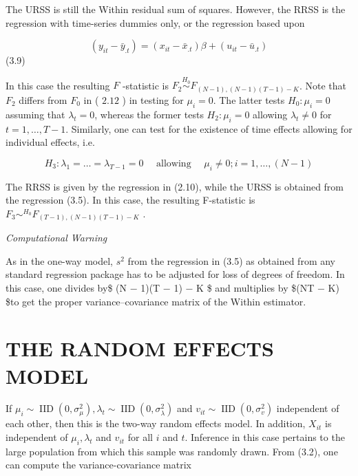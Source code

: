 \documentclass[
]{book}
\begin{document}
The URSS is still the Within residual sum of squares. However, the RRSS is the regression with time-series dummies only, or the regression based upon

\begin{equation}
\left(y_{i t}-\bar{y}_{. t}\right)=\left(x_{i t}-\bar{x}_{. t}\right) \beta+\left(u_{i t}-\bar{u}_{. t}\right)
\end{equation} (3.9)

In this case the resulting \(F\) -statistic is \(F_{2} \stackrel{H_{0}}{\sim} F_{(N-1),(N-1)(T-1)-K}\). Note that \(F_{2}\) differs from \(F_{0}\) in ( \(2.12\) ) in testing for \(\mu_{i}=0\). The latter tests \(H_{0}: \mu_{i}=0\) assuming that \(\lambda_{t}=0\), whereas the former tests \(H_{2}: \mu_{i}=0\) allowing \(\lambda_{t} \neq 0\) for \(t=1, \ldots, T-1\). Similarly, one can test for the existence of time effects allowing for individual effects, i.e.

\begin{equation}
H_{3}: \lambda_{1}=\ldots=\lambda_{T-1}=0 \quad \text { allowing } \quad \mu_{i} \neq 0 ; i=1, \ldots,(N-1)
\end{equation}

The RRSS is given by the regression in (2.10), while the URSS is obtained from the regression
(3.5). In this case, the resulting F-statistic is \(F_{3} \sim^{H_{0}} F_{(T-1),(N-1)(T-1)-K}\) .

\emph{Computational Warning}

As in the one-way model, \(s^2\) from the regression in (3.5) as obtained from any standard regression package has to be adjusted for loss of degrees of freedom. In this case, one divides by\$ (N − 1)(T − 1) − K \$ and multiplies by \$(NT − K) \$to get the proper variance--covariance matrix of the Within estimator.

\hypertarget{the-random-effects-model-1}{%
\section{THE RANDOM EFFECTS MODEL}\label{the-random-effects-model-1}}

If \(\mu_{i} \sim \operatorname{IID}\left(0, \sigma_{\mu}^{2}\right), \lambda_{t} \sim \operatorname{IID}\left(0, \sigma_{\lambda}^{2}\right)\) and \(v_{i t} \sim \operatorname{IID}\left(0, \sigma_{v}^{2}\right)\) independent of each other, then this
is the two-way random effects model. In addition, \(X_{i t}\) is independent of \(\mu_{i}, \lambda_{t}\) and \(v_{i t}\) for all \(i\) and \(t\). Inference in this case pertains to the large population from which this sample was randomly drawn. From (3.2), one can compute the variance-covariance matrix
\end{document}

